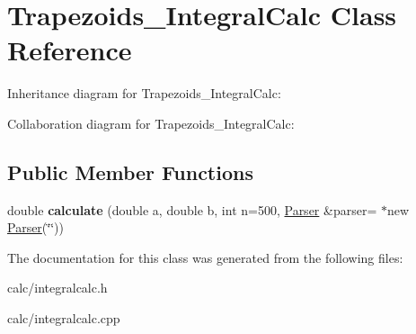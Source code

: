 \hypertarget{class_trapezoids___integral_calc}{}\section{Trapezoids\+\_\+\+Integral\+Calc Class Reference}
\label{class_trapezoids___integral_calc}


Inheritance diagram for Trapezoids\+\_\+\+Integral\+Calc\+:


Collaboration diagram for Trapezoids\+\_\+\+Integral\+Calc\+:
\subsection*{Public Member Functions}
\begin{DoxyCompactItemize}
\item 
\hypertarget{class_trapezoids___integral_calc_a753f85a31ae3da50242a77d1b864dec6}{}\label{class_trapezoids___integral_calc_a753f85a31ae3da50242a77d1b864dec6} 
double {\bfseries calculate} (double a, double b, int n=500, \hyperlink{class_parser}{Parser} \&parser= $\ast$new \hyperlink{class_parser}{Parser}(\char`\"{}\char`\"{}))
\end{DoxyCompactItemize}


The documentation for this class was generated from the following files\+:\begin{DoxyCompactItemize}
\item 
calc/integralcalc.\+h\item 
calc/integralcalc.\+cpp\end{DoxyCompactItemize}

